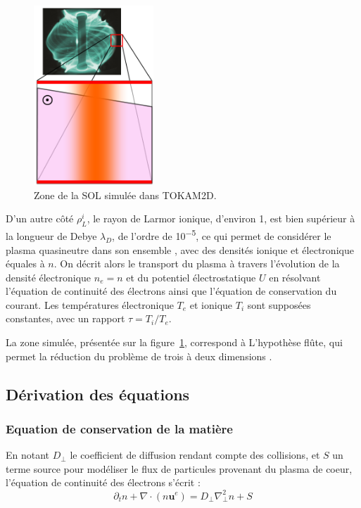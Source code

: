 \begin{figure}
	\vspace{-5pt}

 \hspace{20pt}\includegraphics[width=0.40\textwidth]{figures/geomTokam.png}{\caption{Zone
de la SOL simulée dans TOKAM2D.}\label{figTokamGeom}}
	 \vspace{-20pt}
\end{figure}

D'un autre côté $\rho_L^i$, le rayon de Larmor ionique, d'environ
\unit{1}{\milli\meter}, est bien supérieur à la longueur de
Debye $\lambda_D$, de l'ordre de \unit{10^{-5}}{\meter}, ce qui permet de
considérer le plasma quasineutre dans son ensemble
, avec des densités ionique et électronique équales à $n$.
On décrit alors le transport du plasma à travers l'évolution de la densité
électronique $n_e=n$ et du potentiel électrostatique $U$ en résolvant l'équation
de continuité des électrons ainsi que l'équation de conservation du courant. Les
températures électronique
$T_e$ et ionique $T_i$ sont supposées constantes, avec un rapport $\tau=T_i/T_e$.

La zone simulée, présentée sur la figure~\ref{figTokamGeom}, correspond à  
L'hypothèse flûte, qui permet la réduction du problème de trois à deux
dimensions .
\subsection{Dérivation des équations}
\subsubsection{Equation de conservation de la matière}
En notant $D_\perp$ le coefficient de diffusion rendant compte des collisions,
et $S$ un terme source pour modéliser le flux de particules provenant du plasma
de coeur, l'équation de continuité des électrons s'écrit :
\begin{equation}
\label{2-ContinuiteElectrons}
\partial_t n + \nabla\cdot(n\mathbf{u}^e) = D_\perp\nabla^2_\perp n + S
\end{equation}

